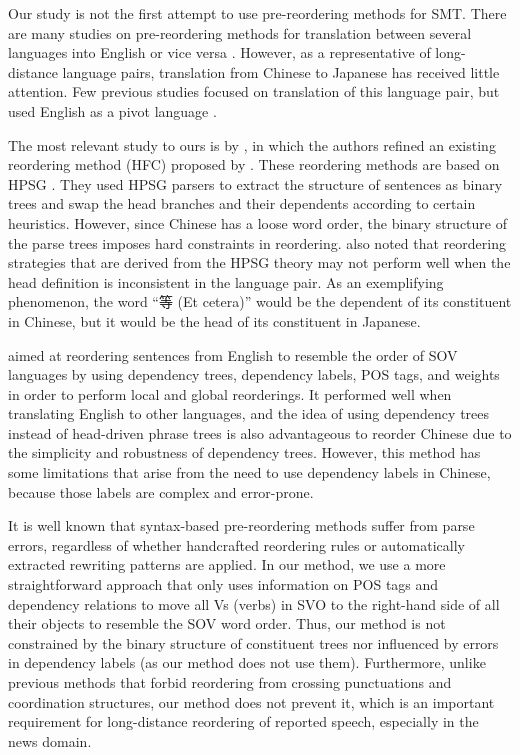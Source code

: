\documentclass[english]{jnlp_1.4}
\begin{document}
Our study is not the first attempt to use pre-reordering methods for SMT.
There are many studies on pre-reordering methods for translation between several languages into English 
or vice versa \cite{FX2004,NH2007,CW2007,CHL2007,XCW2011}.
However, as a representative of long-distance language pairs, translation from
Chinese to Japanese has received little attention. Few previous studies
focused on translation of this language pair, but used English as a pivot language \cite{Wu2007,Tsunakawa2009}.

The most relevant study to ours is by , in which the authors 
refined an existing reordering method (HFC) proposed by . 
These reordering methods are based on HPSG \cite{HPSG1994}. 
They used HPSG parsers \cite{YM2008,KY2011} to extract the structure of 
sentences as binary trees and swap the head branches and their dependents 
according to certain heuristics. However, since Chinese has a loose word order, 
the binary structure of the parse trees imposes hard constraints in reordering.  
also noted that reordering strategies that are derived from the HPSG theory 
may not perform well when the head definition is inconsistent in the language 
pair. As an exemplifying phenomenon, the word ``等 (Et cetera)'' would be the dependent 
of its constituent in Chinese, but it would be the head of its constituent in Japanese.

 aimed at reordering sentences from English 
to resemble the order of SOV languages by using dependency trees, dependency 
labels, POS tags, and weights in order to perform local and global reorderings. 
It performed well when translating English to other languages, and the idea of 
using dependency trees instead of head-driven phrase trees is also advantageous 
to reorder Chinese due to the simplicity and robustness of dependency trees. 
However, this method has some limitations that arise from the need to use dependency 
labels in Chinese, because those labels are complex and error-prone.

It is well known that syntax-based pre-reordering methods suffer from parse errors, 
regardless of whether handcrafted reordering rules  or 
automatically extracted rewriting patterns  are 
applied.
In our method, we use a more straightforward approach that only uses information on
POS tags and dependency relations to move all Vs (verbs) in SVO to the right-hand side of all 
their objects to resemble the SOV word order.
Thus, our method is not constrained by the binary structure of constituent trees
nor influenced by errors in dependency labels (as our method does not use them).
Furthermore, unlike 
previous methods that forbid reordering from crossing punctuations and coordination 
structures, our method does not prevent it, which is an important requirement for 
long-distance reordering of reported speech, especially in the news domain.
\end{document}
